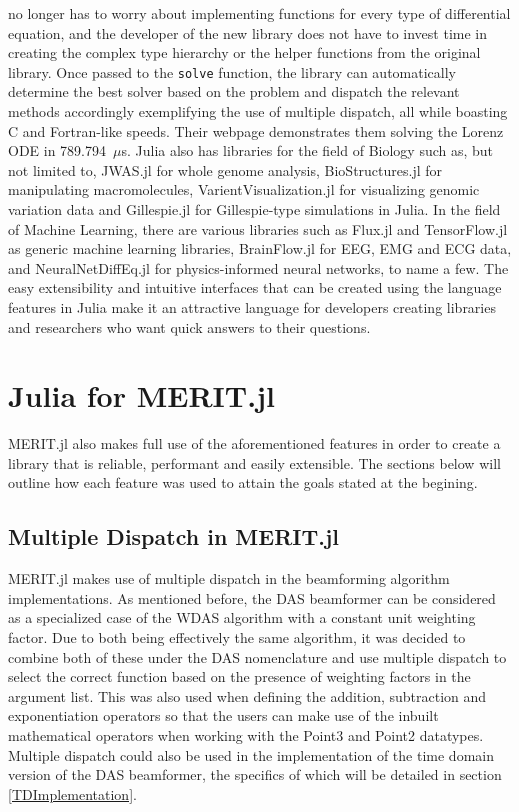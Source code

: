 no longer has to worry about implementing functions for every type of differential equation, and the developer of the
new library does not have to invest time in creating the complex type hierarchy or the helper functions from the
original library. Once passed to the \lstinline[language=Julia]{solve} function, the library can automatically determine
the best solver based on the problem and dispatch the relevant methods accordingly exemplifying the use of multiple
dispatch, all while boasting C and Fortran-like speeds. Their webpage demonstrates them solving the Lorenz ODE in
789.794~$\mu$s. Julia also has libraries for the field of Biology such as, but not limited to, JWAS.jl for whole genome
analysis, BioStructures.jl for manipulating macromolecules, VarientVisualization.jl for visualizing genomic variation
data and Gillespie.jl for Gillespie-type simulations in Julia. In the field of Machine Learning, there are various
libraries such as Flux.jl and TensorFlow.jl as generic machine learning libraries, BrainFlow.jl for EEG, EMG and ECG
data, and NeuralNetDiffEq.jl for physics-informed neural networks, to name a few. The easy extensibility and intuitive
interfaces that can be created using the language features in Julia make it an attractive language for developers
creating libraries and researchers who want quick answers to their questions. 

\section{Julia for MERIT.jl}
MERIT.jl also makes full use of the aforementioned features in order to create a library that is reliable, performant
and easily extensible. The sections below will outline how each feature was used to attain the goals stated at the begining.  

\subsection{Multiple Dispatch in MERIT.jl}
MERIT.jl makes use of multiple dispatch in the beamforming algorithm implementations. As mentioned before, the DAS
beamformer can be considered as a specialized case of the WDAS algorithm with a constant unit weighting factor. Due to
both being effectively the same algorithm, it was decided to combine both of these under the DAS nomenclature and use
multiple dispatch to select the correct function based on the presence of weighting factors in the argument list. This
was also used when defining the addition, subtraction and exponentiation operators so that the users can make use of the
inbuilt mathematical operators when working with the Point3 and Point2 datatypes. Multiple dispatch could also be used
in the implementation of the time domain version of the DAS beamformer, the specifics of which will be detailed in
section \ref{TDImplementation}.  

